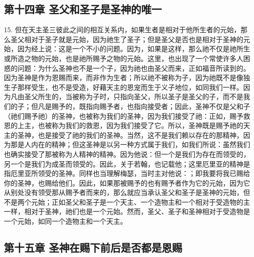 
\subsection{第十四章 圣父和圣子是圣神的唯一}

15. 但在天主圣三彼此之间的相互关系内，如果生者是相对于他所生者的元始，那么圣父相对于圣子就是元始，因为祂生了圣子；但是圣父是否也是相对于圣神的元始，因为经上说：这是一个不小的问题。因为，如果是这样，那么祂不仅是祂所生或所造之物的元始，也是祂所赐予之物的元始。这里，也出现了一个常使许多人困惑的问题：为什么圣神也不是一个子，因为祂也由圣父而来，正如福音所读到的。因为圣神是作为恩赐而来，而非作为生者；所以祂不被称为子，因为祂既不是像独生子那样受生，也不是受造，好藉天主的恩宠而生于义子地位，如同我们一样。因为凡由圣父所生的，当被称为子时，只指向圣父，所以圣子是圣父的子，而不是我们的子；但凡是赐予的，既指向赐予者，也指向接受者；因此，圣神不仅是父和子（祂们赐予祂）的圣神，也被称为我们的圣神，因为我们接受了祂：正如，赐予救恩的上主，也被称为我们的救恩，因为我们接受了它。所以，圣神既是赐予祂的天主的圣神，也是接受了祂的我们的圣神。当然，这不是我们赖以存在的那精神，因为那是人内在的精神；但这圣神是以另一种方式属于我们，如我们所说：虽然我们也确实接受了那被称为人精神的精神。因为他说：但一个是我们为存在而领受的，另一个是我们为成圣而领受的。因此，关于若翰，也记载他；这里厄里亚的精神是指厄里亚所领受的圣神。同样也当理解梅瑟，当时主对他说：；即我要将我已赐给你的圣神，也赐给他们。因此，如果那被赐予的也有赐予者作为它的元始，因为它从别处没有领受那从赐予者而来的，那么就应当承认圣父和圣子是圣神的元始，但不是两个元始；正如圣父和圣子是一个天主、一个造物主和一个相对于受造物的主一样，相对于圣神，祂们也是一个元始。然而，圣父、圣子和圣神相对于受造物是一个元始，如同一个造物主和一个天主。\par


\subsection{第十五章 圣神在赐下前后是否都是恩赐}

